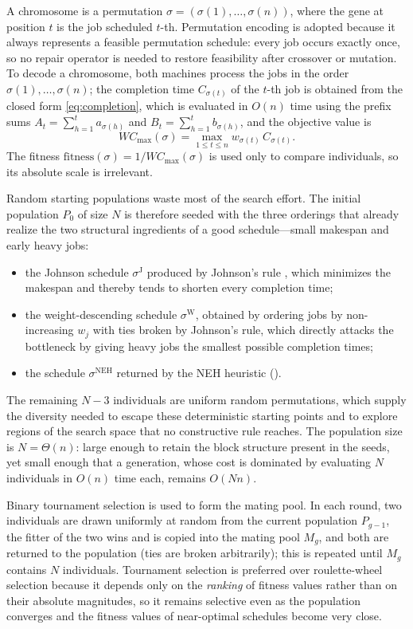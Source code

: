 \documentclass[12pt]{article}
\begin{document}
\begin{sloppypar}
A chromosome is a permutation $\sigma=(\sigma(1),\dots,\sigma(n))$, where the gene at
position $t$ is the job scheduled $t$-th. Permutation encoding is adopted because it always
represents a feasible permutation schedule: every job occurs exactly once, so no repair
operator is needed to restore feasibility after crossover or mutation. To decode a
chromosome, both machines process the jobs in the order $\sigma(1),\dots,\sigma(n)$; the
completion time $C_{\sigma(t)}$ of the $t$-th job is obtained from the closed form
\cref{eq:completion}, which is evaluated in $O(n)$ time using the prefix sums
$A_t=\sum_{h=1}^{t}a_{\sigma(h)}$ and $B_t=\sum_{h=1}^{t}b_{\sigma(h)}$, and the objective
value is
\[
W C_{\max}(\sigma)=\max_{1\le t\le n}w_{\sigma(t)}\,C_{\sigma(t)}.
\]
The fitness $\text{fitness}(\sigma)=1/W C_{\max}(\sigma)$ is used only to compare
individuals, so its absolute scale is irrelevant.

Random starting populations waste most of the search effort. The initial population $P_0$
of size $N$ is therefore seeded with the three orderings that already realize the two
structural ingredients of a good schedule---small makespan and early heavy jobs:
\begin{itemize}
    \item the Johnson schedule $\sigma^{\mathrm{J}}$ produced by Johnson's rule
          \citep{johnson1954optimal}, which minimizes the makespan and thereby tends
          to shorten every completion time;
    \item the weight-descending schedule $\sigma^{\mathrm{W}}$, obtained by ordering jobs
          by non-increasing $w_j$ with ties broken by Johnson's rule, which directly
          attacks the bottleneck by giving heavy jobs the smallest possible completion
          times;
    \item the schedule $\sigma^{\mathrm{NEH}}$ returned by the NEH heuristic
          ().
\end{itemize}
The remaining $N-3$ individuals are uniform random permutations, which supply the diversity
needed to escape these deterministic starting points and to explore regions of the search
space that no constructive rule reaches. The population size is $N=\Theta(n)$: large enough
to retain the block structure present in the seeds, yet small enough that a generation,
whose cost is dominated by evaluating $N$ individuals in $O(n)$ time each, remains $O(Nn)$.

Binary tournament selection is used to form the mating pool. In each round, two individuals
are drawn uniformly at random from the current population $P_{g-1}$, the fitter of the two
wins and is copied into the mating pool $M_g$, and both are returned to the population
(ties are broken arbitrarily); this is repeated until $M_g$ contains $N$ individuals.
Tournament selection is preferred over roulette-wheel selection because it depends only on
the \emph{ranking} of fitness values rather than on their absolute magnitudes, so it remains
selective even as the population converges and the fitness values of near-optimal schedules
become very close.


\end{sloppypar}
\end{document}
